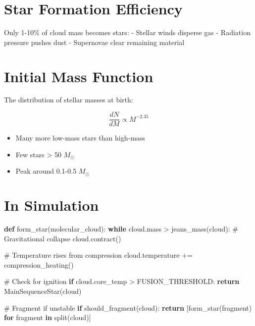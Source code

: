\documentclass[
  11pt,
  letterpaper,
  twoside,
  openright]{book}
\newenvironment{Shaded}{\begin{snugshade}}{\end{snugshade}}
\newcommand{\CommentTok}[1]{\textcolor[rgb]{0.37,0.37,0.37}{#1}}
\newcommand{\ControlFlowTok}[1]{\textcolor[rgb]{0.00,0.23,0.31}{\textbf{#1}}}
\newcommand{\KeywordTok}[1]{\textcolor[rgb]{0.00,0.23,0.31}{\textbf{#1}}}
\newcommand{\NormalTok}[1]{\textcolor[rgb]{0.00,0.23,0.31}{#1}}
\newcommand{\OperatorTok}[1]{\textcolor[rgb]{0.37,0.37,0.37}{#1}}
\providecommand{\tightlist}{%
  \setlength{\itemsep}{0pt}\setlength{\parskip}{0pt}}
\begin{document}
\section{Star Formation Efficiency}\label{star-formation-efficiency}

Only 1-10\% of cloud mass becomes stars: - Stellar winds disperse gas -
Radiation pressure pushes dust - Supernovae clear remaining material

\section{Initial Mass Function}\label{initial-mass-function}

The distribution of stellar masses at birth:

\[
\frac{dN}{dM} \propto M^{-2.35}
\]

\begin{itemize}
\tightlist
\item
  Many more low-mass stars than high-mass
\item
  Few stars \textgreater{} 50 \(M_\odot\)
\item
  Peak around 0.1-0.5 \(M_\odot\)
\end{itemize}

\section{In Simulation}\label{in-simulation-11}

\begin{Shaded}
\begin{Highlighting}[]
\KeywordTok{def}\NormalTok{ form\_star(molecular\_cloud):}
    \ControlFlowTok{while}\NormalTok{ cloud.mass }\OperatorTok{\textgreater{}}\NormalTok{ jeans\_mass(cloud):}
        \CommentTok{\# Gravitational collapse}
\NormalTok{        cloud.contract()}

        \CommentTok{\# Temperature rises from compression}
\NormalTok{        cloud.temperature }\OperatorTok{+=}\NormalTok{ compression\_heating()}

        \CommentTok{\# Check for ignition}
        \ControlFlowTok{if}\NormalTok{ cloud.core\_temp }\OperatorTok{\textgreater{}}\NormalTok{ FUSION\_THRESHOLD:}
            \ControlFlowTok{return}\NormalTok{ MainSequenceStar(cloud)}

        \CommentTok{\# Fragment if unstable}
        \ControlFlowTok{if}\NormalTok{ should\_fragment(cloud):}
            \ControlFlowTok{return}\NormalTok{ [form\_star(fragment) }\ControlFlowTok{for}\NormalTok{ fragment }\KeywordTok{in}\NormalTok{ split(cloud)]}
\end{Highlighting}
\end{Shaded}
\end{document}
